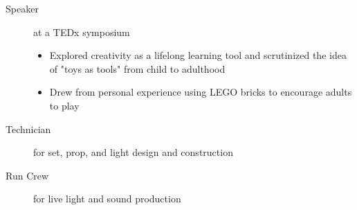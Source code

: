 \documentclass[a4paper]{deedy-resume} %
\begin{document}
    \begin{description}
        \item[Speaker] at a TEDx symposium
        \begin{itemize}
            \item Explored creativity as a lifelong learning tool and scrutinized the idea of "toys as tools" from child to adulthood
            \item Drew from personal experience using LEGO bricks to encourage adults to play
        \end{itemize}
    \end{description}
    \fi


    

    \begin{description}
        \item[Technician] for set, prop, and light design and construction
        \item[Run Crew] for live light and sound production
    \end{description}




    
    
\end{document}
